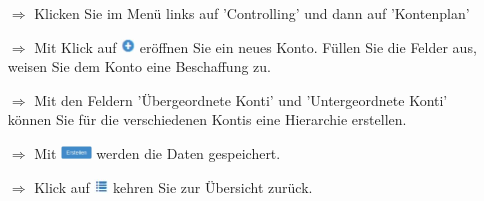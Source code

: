 \documentclass{article}
\begin{document}
\begin{centering}
\end{centering}


\begin{multicols}{2}

\begin{tcolorbox}[colback=blue!5,colframe=blue!40!black,title=Kontenplan erstellen]
\begin{itemize}
  \item[$\Longrightarrow$] Klicken Sie im Menü links auf 'Controlling' und dann auf 'Kontenplan'
  \item[$\Longrightarrow$] Mit Klick auf \includegraphics[height=10pt]{Icons/Plussymbol.jpg} eröffnen Sie ein neues Konto. Füllen Sie die Felder aus, weisen Sie dem Konto eine Beschaffung zu.
	\item[$\Longrightarrow$] Mit den Feldern 'Übergeordnete Konti' und 'Untergeordnete Konti' können Sie für die verschiedenen Kontis eine Hierarchie erstellen.
  \item[$\Longrightarrow$] Mit \includegraphics[height=10pt]{Icons/B_Erstellen.jpg} werden die Daten gespeichert.
  \item[$\Longrightarrow$] Klick auf \includegraphics[height=10pt]{Icons/Listensymbol_zurueck.jpg} kehren Sie zur Übersicht zurück. 
\end{itemize}
\begin{centering}
\end{centering}
\end{tcolorbox}



\end{multicols}
\end{document}
